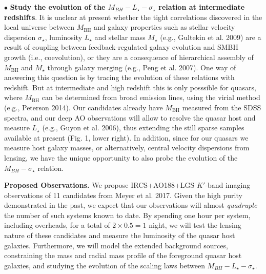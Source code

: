 \documentclass[a4paper,11pt]{article}
\begin{document}
$\bullet$ {\bf Study the evolution of the $M_{BH} - L_\star - \sigma_\star$ relation at intermediate redshifts}. It is unclear at present whether the tight correlations discovered in the local universe between $M_\mathrm{BH}$ and galaxy properties such as stellar velocity dispersion $\sigma_\star$, luminosity $L_\mathrm{\star}$ and stellar mass $M_\mathrm{\star}$ (e.g., Gultekin et al. 2009) are a result of coupling between feedback-regulated galaxy evolution and SMBH growth (i.e., coevolution), or they are a consequence of hierarchical assembly of $M_\mathrm{BH}$ and $M_\mathrm{\star}$ through galaxy merging (e.g., Peng et al. 2007). One way of answering this question is by tracing the evolution of these relations with redshift. But at intermediate and high redshift this is only posssible for quasars, where $M_\mathrm{BH}$ can be determined from broad emission lines, using the virial method (e.g., Peterson 2014). Our candidates already have $M_\mathrm{BH}$ measured from the SDSS spectra, and our deep AO observations will allow to resolve the quasar host and measure $L_{\star}$ (e.g., Guyon et al. 2006), thus extending the still sparse samples available at present (Fig. 1, lower right). In addition, since for our quasars we measure host galaxy masses, or alternatively, central velocity dispersions from lensing, we have the unique opportunity to also probe the evolution of the $M_{BH} - \sigma_\star$ relation. 

{\bf Proposed Observations.} We propose IRCS+AO188+LGS $K'$-band imaging observations of 11 candidates from Meyer et al. 2017. Given the high purity demonstrated in the past, we expect that our observations will almost {\it quadruple} the number of such systems known to date. By spending one hour per system, including overheads, for a total of $2 \times 0.5 = 1$ night, we will test the lensing nature of these candidates and measure the luminosity of the quasar host galaxies. Furthermore, we will model the extended background sources, constraining the mass and radial mass profile of the foreground quasar host galaxies, and studying the evolution of the scaling laws between $M_{BH} - L_\star - \sigma_\star$.
\end{document}
